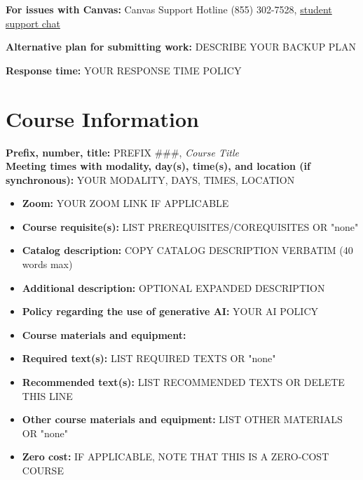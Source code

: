\documentclass[12pt]{article}
\begin{document}
\vspace{0.5em}
\noindent \textbf{For issues with Canvas:} Canvas Support Hotline (855) 302-7528, \href{https://cases.canvaslms.com/liveagentchat?chattype=student&sfid=001A000000YzcwQIAR}{student support chat}

\vspace{0.5em}
\noindent \textbf{Alternative plan for submitting work:} DESCRIBE YOUR BACKUP PLAN

\vspace{0.5em}
\noindent \textbf{Response time:} YOUR RESPONSE TIME POLICY

\section*{Course Information}
\noindent \textbf{Prefix, number, title:} PREFIX \#\#\#, \textit{Course Title} \\
\noindent \textbf{Meeting times with modality, day(s), time(s), and location (if synchronous):} 
YOUR MODALITY, DAYS, TIMES, LOCATION

\vspace{0.5em}
\begin{itemize}[label={}, leftmargin=0pt]
\item \textbf{Zoom:} YOUR ZOOM LINK IF APPLICABLE
\item \textbf{Course requisite(s):} LIST PREREQUISITES/COREQUISITES OR "none"
\item \textbf{Catalog description:} COPY CATALOG DESCRIPTION VERBATIM (40 words max)
\item \textbf{Additional description:} OPTIONAL EXPANDED DESCRIPTION
\item \textbf{Policy regarding the use of generative AI:} YOUR AI POLICY
\item \textbf{Course materials and equipment:} ~
\item \textbf{Required text(s):} LIST REQUIRED TEXTS OR "none"
\item \textbf{Recommended text(s):} LIST RECOMMENDED TEXTS OR DELETE THIS LINE
\item \textbf{Other course materials and equipment:} LIST OTHER MATERIALS OR "none"
\item \textbf{Zero cost:} IF APPLICABLE, NOTE THAT THIS IS A ZERO-COST COURSE
\end{itemize}
\end{document}
